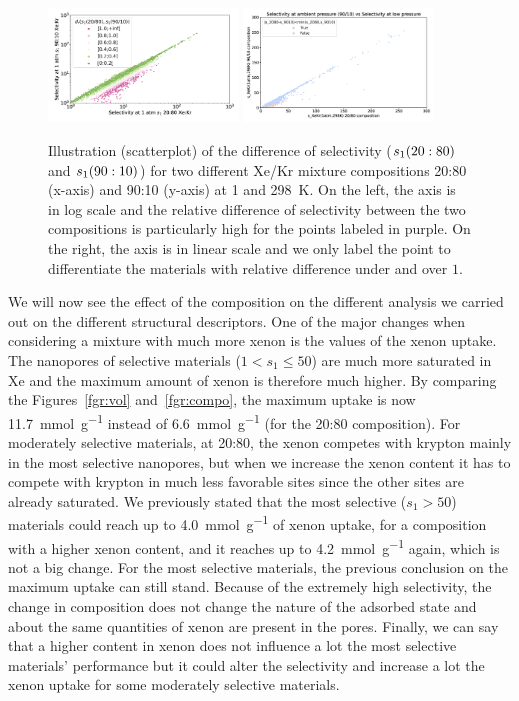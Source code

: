 \documentclass[main.tex]{subfiles}
\begin{document}
\begin{figure}[ht]
  \centering
    \includegraphics[width=0.45\textwidth]{figures/2-thermo/s_2080_vs_s_9010_overview_log.jpg}
    \includegraphics[width=0.45\textwidth]{figures/2-thermo/s_2080_vs_s_9010_overview.jpg}
    \caption{Illustration (scatterplot) of the difference of selectivity ($s_{\text{1}}(20:80)$ and $s_{\text{1}}(90:10)$) for two different Xe/Kr mixture compositions 20:80 (x-axis) and 90:10 (y-axis) at \SI{1}{\atm} and \SI{298}{\kelvin}. On the left, the axis is in log scale and the relative difference of selectivity between the two compositions is particularly high for the points labeled in purple. On the right, the axis is in linear scale and we only label the point to differentiate the materials with relative difference under and over $1$.}\label{fgr:SI:overview_2080_9010}
  \end{figure}

We will now see the effect of the composition on the different analysis we carried out on the different structural descriptors. One of the major changes when considering a mixture with much more xenon is the values of the xenon uptake. The nanopores of selective materials ($1<s_1\leq 50$) are much more saturated in Xe and the maximum amount of xenon is therefore much higher. By comparing the Figures~\ref{fgr:vol} and~\ref{fgr:compo}, the maximum uptake is now \SI{11.7}{\milli\mole\per\gram} instead of \SI{6.6}{\milli\mole\per\gram} (for the 20:80 composition). For moderately selective materials, at 20:80, the xenon competes with krypton mainly in the most selective nanopores, but when we increase the xenon content it has to compete with krypton in much less favorable sites since the other sites are already saturated. We previously stated that the most selective ($s_1>50$) materials could reach up to \SI{4.0}{\milli\mole\per\gram} of xenon uptake, for a composition with a higher xenon content, and it reaches up to \SI{4.2}{\milli\mole\per\gram} again, which is not a big change. For the most selective materials, the previous conclusion on the maximum uptake can still stand. Because of the extremely high selectivity, the change in composition does not change the nature of the adsorbed state and about the same quantities of xenon are present in the pores. Finally, we can say that a higher content in xenon does not influence a lot the most selective materials' performance but it could alter the selectivity and increase a lot the xenon uptake for some moderately selective materials.
\end{document}
